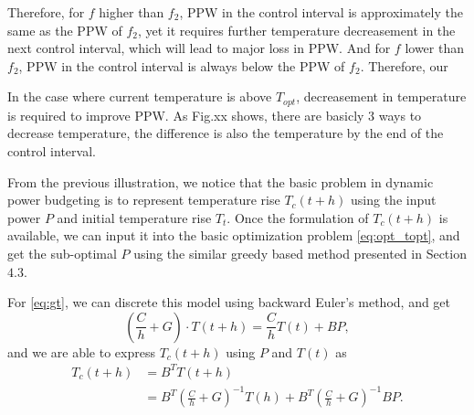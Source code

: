 Therefore, for $f$ higher than $f_{2}$, PPW in the control interval is approximately the same as the PPW of $f_{2}$, yet it requires further temperature decreasement in the next control interval, which will lead to major loss in PPW. And for $f$ lower than $f_{2}$, PPW in the control interval is always below the PPW of $f_{2}$. Therefore, our 

In the case where current temperature is above $T_{opt}$, decreasement in temperature is required to improve PPW. As Fig.xx shows, there are basicly $3$ ways to decrease temperature, the difference is also the temperature by the end of the control interval.



From the previous illustration, we notice that the basic problem in dynamic power budgeting is to represent temperature rise $T_{c}(t+h)$ using the input power $P$ and initial temperature rise $T_{t}$. Once the formulation of $T_{c}(t+h)$ is available, we can input it into the basic optimization problem \eqref{eq:opt_topt}, and get the sub-optimal $P$ using the similar greedy based method presented in Section $4.3$.




For \eqref{eq:gt}, we can discrete this model using backward Euler's method, and get
\begin{equation}\label{eq:discrete_gt}
(\frac{C}{h}+G)\cdot T(t+h)=\frac{C}{h}T(t)+BP,
\end{equation}
and we are able to express $T_{c}(t+h)$ using $P$ and $T(t)$ as
\begin{equation}\label{eq:discrete_gt}
  \begin{split}
T_{c}(t+h)&=B^{T}T(t+h)\\
&=B^{T}(\frac{C}{h}+G)^{-1}T(h)+B^{T}(\frac{C}{h}+G)^{-1}BP.
  \end{split}
\end{equation}

